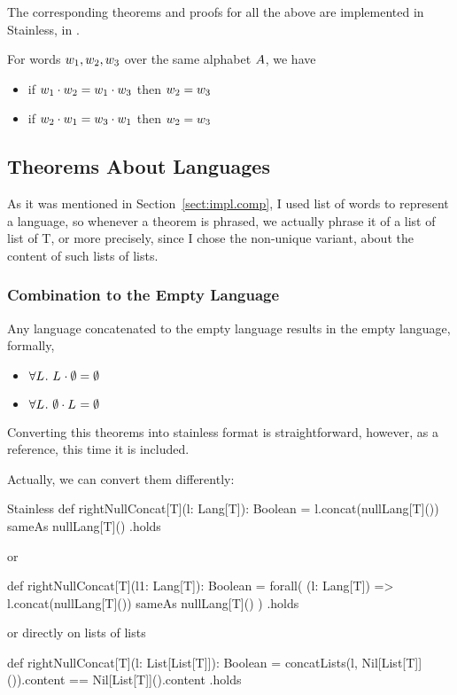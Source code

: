 The corresponding theorems and proofs for all the above are implemented in Stainless, in .

\begin{theorem}
	For words $w_{1}, w_{2}, w_{3}$ over the same alphabet $A$, we have
	\begin{itemize}
		\item if $w_{1} \cdot w_{2} = w_{1} \cdot w_{3}$ then $w_{2} = w_{3}$
		\item if $w_{2} \cdot w_{1} = w_{3} \cdot w_{1}$ then $w_{2} = w_{3}$
	\end{itemize}
\end{theorem}

\subsection{Theorems About Languages}

As it was mentioned in Section~\ref{sect:impl.comp}, I used list of words to represent a language, so whenever a theorem is phrased, we actually phrase it of a list of list of T, or more precisely, since I chose the non-unique variant, about the content of such lists of lists.


\subsubsection{Combination to the Empty Language}

\begin{theorem}
	Any language concatenated to the empty language results in the empty language, formally,
	\begin{itemize}
		\item $\forall L_{}. ~ L_{} \cdot \emptyset = \emptyset$
		\item $\forall L_{}. ~ \emptyset \cdot L_{} = \emptyset$
	\end{itemize}
\end{theorem}

Converting this theorems into stainless format is straightforward, however, as a reference, this time it is included.

Actually, we can convert them  differently:

\begin{ShortCode}{Stainless}
 def rightNullConcat[T](l: Lang[T]): Boolean = {
   l.concat(nullLang[T]()) sameAs nullLang[T]()
 }.holds	
 
 or
 
 def rightNullConcat[T](l1: Lang[T]): Boolean = {
   forall( (l: Lang[T]) => 
       l.concat(nullLang[T]()) sameAs nullLang[T]()
   )
 }.holds
 
 or directly on lists of lists
 
 def rightNullConcat[T](l: List[List[T]]): Boolean = {
    concatLists(l, Nil[List[T]]()).content == 
 	                               Nil[List[T]]().content
 }.holds
 
\end{ShortCode}


